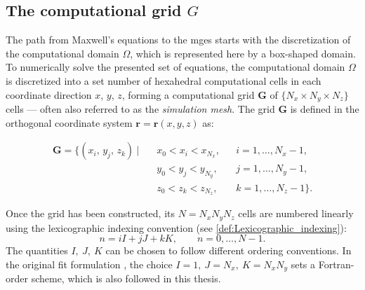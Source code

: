 \subsection{The computational grid $G$}
\label{sec:mge_integral}

The path from Maxwell's equations to the \glspl{mge} starts with the discretization of the computational domain $\Omega$, which is represented here by a box-shaped domain. To numerically solve the presented set of equations, the computational domain $\Omega$ is discretized into a set number of hexahedral computational cells in each coordinate direction $x$, $y$, $z$, forming a computational grid $\mathbf{G}$ of $\{N_x \times N_y
\times N_z\}$ cells --- often also referred to as the \textit{simulation mesh}. The grid $\mathbf{G}$ is defined in the orthogonal
coordinate system $\mathbf{r} = \mathbf{r}(x,y,z)$ as:

\begin{equation}
\begin{aligned}
\mathbf{G} = \bigl\{(x_i,\,y_j,\,z_k)\ \big|\quad
&x_0 < x_i < x_{N_x}, &&i = 1,\ldots,N_x-1,\\ &y_0 < y_j < y_{N_y}, &&j = 1,\ldots,N_y-1,\\ &z_0 < z_k < z_{N_z}, &&k = 1,\ldots,N_z-1
\bigr\}.
\end{aligned}
\label{eq:grid}
\end{equation}

Once the grid has been constructed, its $N=N_xN_yN_z$ cells are numbered linearly using the lexicographic indexing convention (see
\autoref{def:Lexicographic_indexing}):
%
\begin{equation}
n = iI+ jJ + kK,
\qquad n = 0,\ldots,N - 1.
\end{equation}
%
The quantities $I,\ J,\ K$ can be chosen to follow different ordering conventions. In the original \gls{fit} formulation
\cite{weiland_wake_1992}, the choice $I = 1,\ J = N_x,\ K = N_xN_y$ sets a Fortran-order scheme, which is also followed in this thesis.



